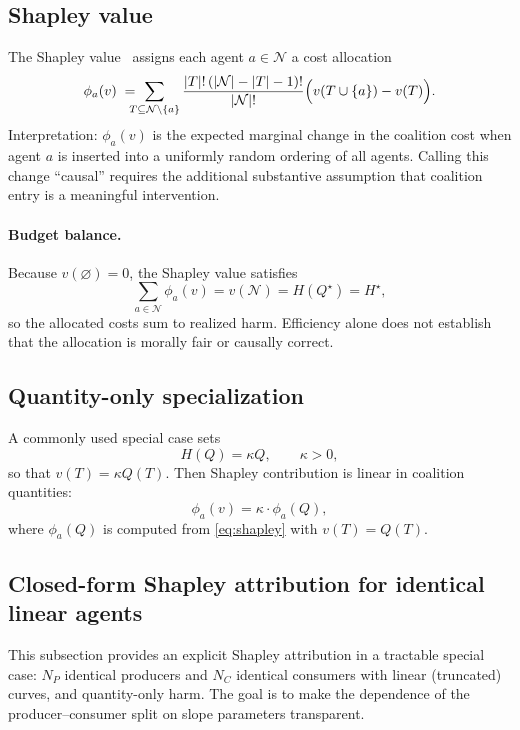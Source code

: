 \documentclass[journal, a4paper]{IEEEtran}
\begin{document}
\subsection{Shapley value}
The Shapley value~\cite{Shapley1953} assigns each agent $a\in \mathcal{N}$ a cost allocation
\begin{equation}
\phi_a(v)\;=\mspace{-13mu}\sum_{T\subseteq \mathcal{N}\setminus\{a\}}
\frac{|T|!\,(|\mathcal{N}|-|T|-1)!}{|\mathcal{N}|!}\Big(v(T\cup\{a\})-v(T)\Big).
\label{eq:shapley}
\end{equation}
Interpretation: $\phi_a(v)$ is the expected marginal change in the coalition cost when agent $a$ is inserted into a uniformly random ordering of all agents. Calling this change ``causal'' requires the additional substantive assumption that coalition entry is a meaningful intervention.

\paragraph{Budget balance.}
Because $v(\varnothing)=0$, the Shapley value satisfies
\begin{equation}
\sum_{a\in \mathcal{N}} \phi_a(v)=v(\mathcal{N})=H(Q^\star)=H^\star,
\end{equation}
so the allocated costs sum to realized harm. Efficiency alone does not establish that the allocation is morally fair or causally correct.

\subsection{Quantity-only specialization}
A commonly used special case sets
\begin{equation}
H(Q)=\kappa Q,\qquad \kappa>0,
\label{eq:linearharm}
\end{equation}
so that $v(T)=\kappa Q(T)$. Then Shapley contribution is linear in coalition quantities:
\begin{equation}
\phi_a(v)=\kappa\cdot \phi_a(Q),
\end{equation}
where $\phi_a(Q)$ is computed from \eqref{eq:shapley} with $v(T)=Q(T)$.


\subsection{Closed-form Shapley attribution for identical linear agents}
\label{sec:shapley_linear_identical}
This subsection provides an explicit Shapley attribution in a tractable special case: $N_P$ identical producers and $N_C$ identical consumers with linear (truncated) curves, and quantity-only harm. The goal is to make the dependence of the producer--consumer split on slope parameters transparent.
\end{document}

